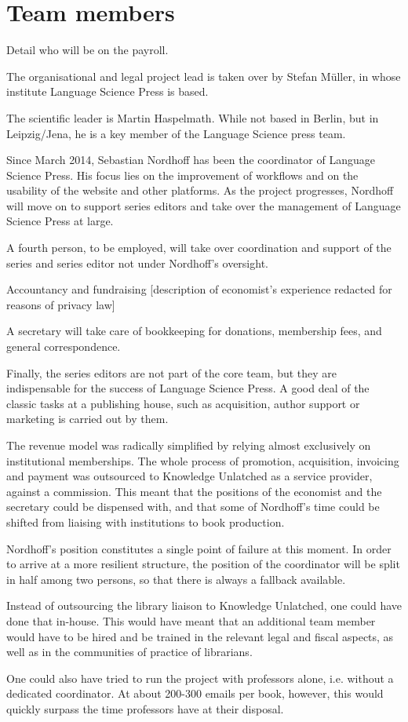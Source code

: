 \documentclass[output=guidelines,nonflat,smallfont,
draftmode
]{langsci/langscibook}
\newcommand{\background}[1]{ 
  \vspace{5mm}
  \renewcommand{\tblslinecolour}{lsDarkBlue}
  \tblssy[red]{explore2}{Background}{\vspace*{-5mm}#1}
}
\newcommand{\langscisolution}[1]{
  \renewcommand{\tblslinecolour}{lsLightBlue}
  \tblssy{langsci}{LangSci solution}{\vspace*{-5mm}#1}
}
\newcommand{\evaluation}[1]{
  \renewcommand{\tblslinecolour}{lsLightOrange}
  \tblssy{receipt}{Evaluation}{\vspace*{-5mm}#1}
}
\newcommand{\othersolutions}[1]{
  \renewcommand{\tblslinecolour}{lsDarkGreenOne}
  \tblssy{more}{Other solutions}{\vspace*{-5mm}#1}
}
\renewcommand{\tblssy}[4][black!12]{%
  \renewcommand{\langscisymbol}{#2}\renewcommand{\tblsboxcolor}{#1}
  \begin{mdframed}[style=yellowexercise,frametitle={#3}]
    #4
  \end{mdframed}
}
\begin{document}
\section{Team members}

\background{Detail who will be on the payroll. }
\langscisolution{
The organisational and legal project lead is taken over by Stefan Müller, in whose institute Language Science Press is based.

The scientific leader is Martin Haspelmath. While not based in Berlin, but in Leipzig/Jena, he is a key member of the Language Science press team.

Since March 2014, Sebastian Nordhoff has been the coordinator of Language Science Press. His focus lies on the improvement of workflows and on the usability of the website and other platforms. As the project progresses, Nordhoff will move on to support series editors and take over the management of Language Science Press at large.

A fourth person, to be employed, will take over coordination and support of the series and series editor not under Nordhoff's oversight. 

Accountancy and fundraising
[description of economist's experience redacted for reasons of  privacy law]

A secretary will take care of bookkeeping for donations, membership fees, and general correspondence.

Finally, the series editors are not part of the core team, but they are indispensable for the success of Language Science Press. A good deal of the classic tasks at a publishing house, such as acquisition, author support or marketing is carried out by them. 

}
\evaluation{The revenue model was radically simplified by relying almost exclusively on institutional memberships. The whole process of promotion, acquisition, invoicing and payment was outsourced to Knowledge Unlatched as a service provider, against a commission. This meant that the positions of the economist and the secretary could be dispensed with, and that some of Nordhoff's time could be shifted from liaising with institutions to book production. 

Nordhoff's position constitutes a single point of failure at this moment. In order to arrive at a more resilient structure, the position of the coordinator will be split in half among two persons, so that there is always a fallback available.
}
\othersolutions{
Instead of outsourcing the library liaison to Knowledge Unlatched, one could have done that in-house. This would have meant that an additional team member would have to be hired and be trained in the relevant legal and fiscal aspects, as well as in the communities of practice of librarians. 

One could also have tried to run the project with professors alone, i.e. without a dedicated coordinator. At about 200-300 emails per book, however, this would quickly surpass the time professors have at their disposal. 
}
 
\end{document}
